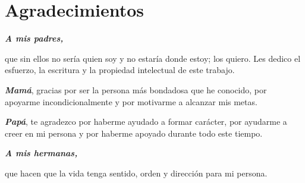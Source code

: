 


\chapter*{Agradecimientos}
\thispagestyle{agrad}

\textit{\textbf{\large{A mis padres,}}}

que sin ellos no sería quien soy y no estaría donde estoy; los quiero. Les dedico el esfuerzo, la escritura y la propiedad intelectual de este trabajo.

\textit{\textbf{Mamá}}, gracias por ser la persona más bondadosa que he conocido, por apoyarme incondicionalmente y por motivarme a alcanzar mis metas.

\textit{\textbf{Papá}}, te agradezco por haberme ayudado a formar carácter, por ayudarme a creer en mi persona y por haberme apoyado durante todo este tiempo.


\textit{\textbf{\large{A mis hermanas,}}}

que hacen que la vida tenga sentido, orden y dirección para mi persona.


